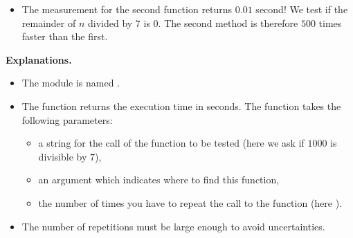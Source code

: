 \documentclass[11pt,class=report,crop=false]{standalone}
\begin{document}
\begin{cours}
\begin{itemize}
  \item The measurement for the second function returns $0.01$ second! We test if the remainder of $n$ divided by $7$ is $0$. The second method is therefore $500$ times faster than the first.
\end{itemize}  

\medskip

\textbf{Explanations.}
\begin{itemize}
  \item The module is named .
    
  \item The function  returns the execution time in seconds.
The function takes the following parameters: 
  \begin{itemize}
    \item a string for the call of the function to be tested (here we ask if $1000$ is divisible by $7$),
    \item an argument  which indicates where to find this function,
    \item the number of times you have to repeat the call to the function (here ).
  \end{itemize}
  \item The number of repetitions must be large enough to avoid uncertainties.
\end{itemize} 

\end{cours}


\end{document}
